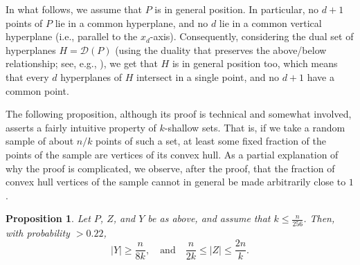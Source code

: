 \documentclass[11pt]{article}
\newtheorem{proposition}[theorem]{Proposition}
{\theorembodyfont{\rm} \newtheorem{defn}[theorem]{Definition}}
\begin{document}
In what follows, we assume that $P$ is in general position. In particular, no $d+1$ points of $P$ lie in a common hyperplane, and no $d$ lie in a common vertical hyperplane (i.e., parallel to the $x_{d}$-axis). Consequently, considering the dual set of hyperplanes $H = \mathcal{D}(P)$ (using the duality that preserves the above/below relationship; see, e.g., \cite{ed87}), we get that $H$ is in general position too, which means that every $d$ hyperplanes of $H$ intersect in a single point, and no $d+1$ have a common point.



The following proposition, although its proof is technical and somewhat involved, asserts a fairly intuitive property of $k$-shallow sets. That is, if we take a random sample of about $n/k$ points of such a set, at least some fixed fraction of the points of the sample are vertices of its convex hull. As a partial explanation of why the proof is complicated, we observe, after the proof, that the fraction of convex hull vertices of the sample cannot in general be made arbitrarily close to $1$.

\begin{proposition} \label{lemma_prob} Let $P$, $Z$, and $Y$ be as above, and assume that $k \leq \frac{n}{256}$. Then, with probability $> 0.22$,
$$
|Y| \geq \frac{n}{8k}, \quad \text{and} \quad \frac{n}{2k} \leq |Z| \leq \frac{2n}{k}.
$$
\end{proposition}
\end{document}
